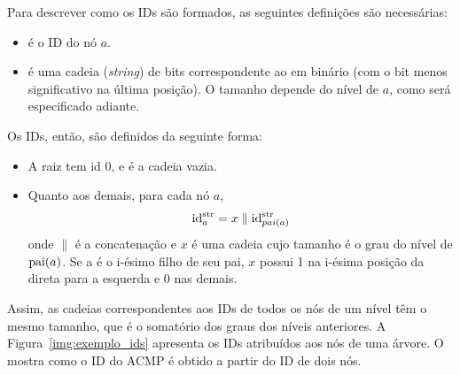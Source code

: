 Para descrever como os IDs são formados, as seguintes definições são necessárias:
\begin{itemize}
	\item {} é o ID do nó $a$.
	\item {} é uma cadeia (\textit{string}) de bits correspondente ao  em binário (com o bit menos significativo na última posição). O tamanho depende do nível de $a$, como será especificado adiante.
\end{itemize}
Os IDs, então, são definidos da seguinte forma:
\begin{itemize}
	\item A raiz tem id 0, e  é a cadeia vazia.
	\item Quanto aos demais, para cada nó $a$,
		$$\mathrm{id}_{a}^{\mathrm{str}} = x \parallel \mathrm{id}_{pai(a)}^{\mathrm{str}}$$
	onde $\parallel$ é a concatenação e $x$ é uma cadeia cujo tamanho é o grau do nível de $\operatorname{pai}(a)$.
	Se a é o i-ésimo filho de seu pai, $x$ possui 1 na i-ésima posição da direta para a esquerda e 0 nas demais.
\end{itemize}

Assim, as cadeias correspondentes aos IDs de todos os nós de um nível têm o mesmo tamanho, que é o somatório dos graus dos níveis anteriores.
A Figura~\ref{img:exemplo_ids} apresenta os IDs atribuídos aos nós de uma árvore.
O  mostra como o ID do ACMP é obtido a partir do ID de dois nós.

